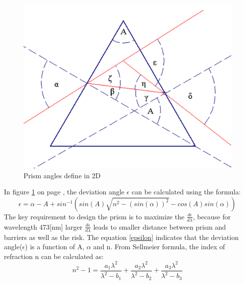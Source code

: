 \begin{figure}[ht!]
\centering
\includegraphics[scale = 0.8]{chapters/img/Prism2D.png}
\caption{Prism angles define in 2D}
\label{fig:prism2D}
\end{figure} 
In figure \ref{fig:prism2D} on page \pageref{fig:prism2D}, the deviation angle $\epsilon$ can be calculated using the formula\cite{prism_angle_calculation}:
\begin{equation}
\label{epsilon}
\epsilon = \alpha - A + sin^{-1}(sin(A)\sqrt{n^2 - (sin(\alpha))^2} - cos(A)sin(\alpha))
\end {equation}
The key requirement to design the prism is to maximize the $\frac{d\epsilon}{d\lambda}$,  because for wavelength 473[nm] larger $\frac{d\epsilon}{d\lambda}$ leads to smaller distance between prism and barriers as well as the risk. The equation \ref{epsilon} indicates that the deviation angle($\epsilon$) is a function of A, $\alpha$ and n. From Sellmeier formula\cite{prism_book}, the index of refraction n can be calculated as:
\begin{equation}
\label{index_refraction}
n^2 - 1 = \frac{a_{1}\lambda^2}{\lambda^2-b_{1}} + \frac{a_{2}\lambda^2}{\lambda^2-b_{2}} + \frac{a_{3}\lambda^2}{\lambda^2-b_{3}}
\end {equation}
